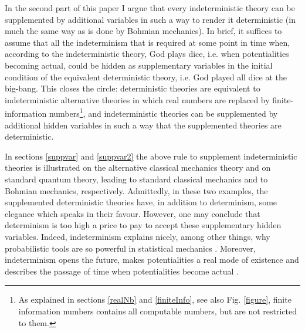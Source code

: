 \documentclass[floatfix,12pt]{article}
\begin{document}
In the second part of this paper I argue that every indeterministic theory can be supplemented by additional variables in such a way to render it deterministic (in much the same way as is done by Bohmian mechanics). In brief, it suffices to assume that all the indeterminism that is required at some point in time when, according to the indeterministic theory, God plays dice, i.e. when potentialities becoming actual, could be hidden as supplementary variables in the initial condition of the equivalent deterministic theory, i.e. God played all dice at the big-bang. This closes the circle: deterministic theories are equivalent to indeterministic alternative theories in which real numbers are replaced by finite-information numbers\footnote{As explained in sections \ref{realNb} and \ref{finiteInfo}, see also Fig. \ref{figure}, finite information numbers contains all computable numbers, but are not restricted to them.}, and indeterministic theories can be supplemented by additional hidden variables in such a way that the supplemented theories are deterministic. %

In sections \ref{suppvar} and \ref{suppvar2} the above rule to supplement indeterministic theories is illustrated on the alternative classical mechanics theory and on standard quantum theory, leading to standard classical mechanics and to Bohmian mechanics, respectively. Admittedly, in these two examples, the supplemented deterministic theories have, in addition to determinism, some elegance which speaks in their favour. However, one may conclude that determinism is too high a price to pay to accept these supplementary hidden variables. Indeed, indeterminism explains nicely, among other things, why probabilistic tools are so powerful in statistical mechanics \cite{Drossel}. Moreover, indeterminism opens the future, makes potentialities a real mode of existence and describes the passage of time when potentialities become actual \cite{NortonTimePasses,Dolev18}.
\end{document}
